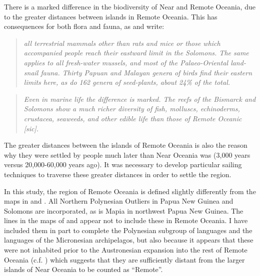 \documentclass[unnumsec,webpdf,modern,medium]{oup-authoring-template}
\begin{document}
\begin{appendices}
There is a marked difference in the biodiversity of Near and Remote Oceania, due to the greater distances between islands in Remote Oceania. This has consequences for both flora and fauna, as \citet{green1991near} and \citet{pawley2007locatingoceanic} write:

\begin{quotation}
\noindent \emph{all terrestrial mammals other than rats and mice or those which accompanied people reach their eastward limit in the Solomons. The same applies to all fresh-water mussels, and most of the Palaeo-Oriental land-snail fauna. Thirty Papuan and Malayan genera of birds find their eastern limits here, as do 162 genera of seed-plants, about 24\% of the total.}
\end{quotation}
\begin{flushright} \citet[495]{green1991near}
\end{flushright}

\begin{quotation}
\noindent \emph{Even in marine life the difference is marked. The reefs of the Bismarck and Solomons show a much richer diversity of fish, molluscs, echinoderms, crustacea, seaweeds, and other edible life than those of Remote Oceanic [sic].}
\end{quotation}
\begin{flushright}  \citet[19]{pawley2007locatingoceanic} \end{flushright}

The greater distances between the islands of Remote Oceania is also the reason why they were settled by people much later than Near Oceania was (3,000 years versus 20,000-60,000 years ago). It was necessary to develop particular sailing techniques to traverse these greater distances in order to settle the region.

In this study, the region of Remote Oceania is defined slightly differently from the maps in \citet{green1991near} and \citet{pawley2007locatingoceanic}. All Northern Polynesian Outliers in Papua New Guinea and Solomons are incorporated, as is Mapia in northwest Papua New Guinea. The lines in the maps of \citet{green1991near} and \citet{pawley2007locatingoceanic} appear not to include these in Remote Oceania. I have included them in part to complete the Polynesian subgroup of languages and the languages of the Micronesian archipelagos, but also because it appears that these were not inhabited prior to the Austronesian expansion into the rest of Remote Oceania (c.f. \citet[23]{kirch2012basline}) which suggests that they are sufficiently distant from the larger islands of Near Oceania to be counted as ``Remote''.


\end{appendices}
\end{document}
